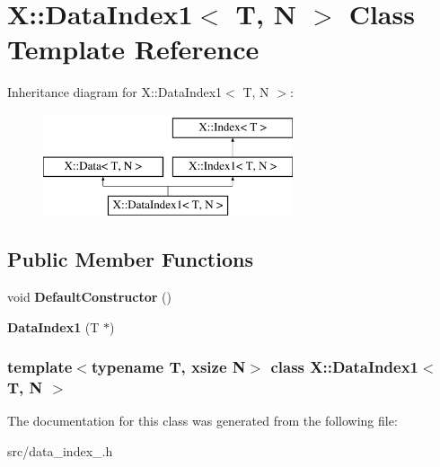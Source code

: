 \hypertarget{class_x_1_1_data_index1}{\section{X\-:\-:Data\-Index1$<$ T, N $>$ Class Template Reference}
\label{class_x_1_1_data_index1}
}
Inheritance diagram for X\-:\-:Data\-Index1$<$ T, N $>$\-:\begin{figure}[H]
\begin{center}
\leavevmode
\includegraphics[height=3.000000cm]{class_x_1_1_data_index1}
\end{center}
\end{figure}
\subsection*{Public Member Functions}
\begin{DoxyCompactItemize}
\item 
\hypertarget{class_x_1_1_data_index1_a02ba45636320fa3dd627646faedb7056}{void {\bfseries Default\-Constructor} ()}\label{class_x_1_1_data_index1_a02ba45636320fa3dd627646faedb7056}

\item 
\hypertarget{class_x_1_1_data_index1_a2943aafc09d6e22164a2ec424ecc326a}{{\bfseries Data\-Index1} (T $\ast$)}\label{class_x_1_1_data_index1_a2943aafc09d6e22164a2ec424ecc326a}

\end{DoxyCompactItemize}
\subsubsection*{template$<$typename T, xsize N$>$ class X\-::\-Data\-Index1$<$ T, N $>$}



The documentation for this class was generated from the following file\-:\begin{DoxyCompactItemize}
\item 
src/data\-\_\-index\-\_.\-h\end{DoxyCompactItemize}
